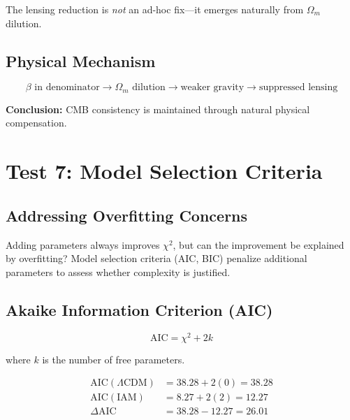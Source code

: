 \documentclass[11pt,letterpaper]{article}
\begin{document}
\noindent The lensing reduction is \textit{not} an ad-hoc fix---it emerges naturally from $\Omega_m$ dilution.

\subsection{Physical Mechanism}

\begin{equation}
\beta \text{ in denominator} \rightarrow \Omega_m \text{ dilution} \rightarrow \text{weaker gravity} \rightarrow \text{suppressed lensing}
\end{equation}

\noindent\textbf{Conclusion:} CMB consistency is maintained through natural physical compensation.

\section{Test 7: Model Selection Criteria}

\subsection{Addressing Overfitting Concerns}

Adding parameters always improves $\chi^2$, but can the improvement be explained by overfitting? Model selection criteria (AIC, BIC) penalize additional parameters to assess whether complexity is justified.

\subsection{Akaike Information Criterion (AIC)}

\begin{equation}
\text{AIC} = \chi^2 + 2k
\end{equation}

where $k$ is the number of free parameters.

\begin{align*}
\text{AIC}(\Lambda\text{CDM}) &= 38.28 + 2(0) = 38.28 \\
\text{AIC}(\text{IAM}) &= 8.27 + 2(2) = 12.27 \\
\Delta\text{AIC} &= 38.28 - 12.27 = 26.01
\end{align*}
\end{document}
